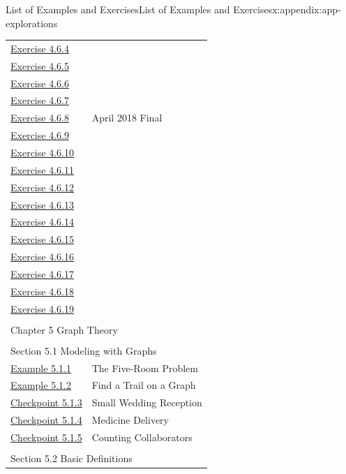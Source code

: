 \documentclass[oneside,10pt,]{book}
\numberwithin{equation}{section}
\begin{document}
\begin{appendixptx}{List of Examples and Exercises}{}{List of Examples and Exercises}{}{}{x:appendix:app-explorations}
\begin{longtable}[l]{ll}
\hyperlink{g:exercise:id331059}{Exercise 4.6.4}& \\
\hyperlink{g:exercise:id331314}{Exercise 4.6.5}& \\
\hyperlink{g:exercise:id329786}{Exercise 4.6.6}& \\
\hyperlink{g:exercise:id345624}{Exercise 4.6.7}& \\
\hyperlink{g:exercise:id345619}{Exercise 4.6.8}& April 2018 Final\\
\hyperlink{g:exercise:id345670}{Exercise 4.6.9}& \\
\hyperlink{g:exercise:id345749}{Exercise 4.6.10}& \\
\hyperlink{g:exercise:id345853}{Exercise 4.6.11}& \\
\hyperlink{g:exercise:id345934}{Exercise 4.6.12}& \\
\hyperlink{g:exercise:id345961}{Exercise 4.6.13}& \\
\hyperlink{x:exercise:ex-cong-power-two}{Exercise 4.6.14}& \\
\hyperlink{g:exercise:id250033}{Exercise 4.6.15}& \\
\hyperlink{x:exercise:ex-cong-phi-prime-power-prod}{Exercise 4.6.16}& \\
\hyperlink{g:exercise:id248997}{Exercise 4.6.17}& \\
\hyperlink{g:exercise:id249537}{Exercise 4.6.18}& \\
\hyperlink{g:exercise:id254572}{Exercise 4.6.19}& \\
\multicolumn{2}{l}{\null}\\[1.5ex] \multicolumn{2}{l}{\large Chapter 5 Graph Theory}\\[0.5ex]
\multicolumn{2}{l}{\null}\\[1.5ex] \multicolumn{2}{l}{\large Section 5.1 Modeling with Graphs}\\[0.5ex]
\hyperref[x:example:eg-graph-model-room]{Example 5.1.1}& The Five-Room Problem\\
\hyperref[x:example:eg-graph-model-eulerian]{Example 5.1.2}& Find a Trail on a Graph\\
\hyperref[x:exercise:ex-graph-g8]{Checkpoint 5.1.3}& Small Wedding Reception\\
\hyperref[x:exercise:ex-graph-herbs]{Checkpoint 5.1.4}& Medicine Delivery\\
\hyperref[x:exercise:ex-graph-coauthors]{Checkpoint 5.1.5}& Counting Collaborators\\
\multicolumn{2}{l}{\null}\\[1.5ex] \multicolumn{2}{l}{\large Section 5.2 Basic Definitions}\\[0.5ex]

\end{longtable}
\end{appendixptx}
\end{document}

